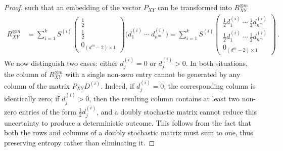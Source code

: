 \documentclass[aps,pra,11pt,onecolumn,nofootinbib,tightenlines]{revtex4-2}
\theoremstyle{definition}
\begin{document}
\begin{proof}
such that an embedding of the vector \( P_{XY} \) can be transformed into \( R_{XY}^{\otimes m} \)
\begin{align}\label{eq:apu3}
R_{XY}^{\otimes m}&=\sum_{i=1}^k S^{(i)}
\begin{pmatrix}
    \frac{1}{2}\\
    \frac{1}{2} \\
    0_{(d^m-2)\times 1}
\end{pmatrix}
\big(d^{(i)}_{1}\ \cdots\ d^{(i)}_{n^m}\big)=\sum_{i=1}^k S^{(i)}
\begin{pmatrix}
    \frac{1}{2}d^{(i)}_{1}\ \cdots\ \frac{1}{2}d^{(i)}_{n^m} \\
   \frac{1}{2} d^{(i)}_{1}\ \cdots\ \frac{1}{2}d^{(i)}_{n^m} \\
   0_{(d^m-2) \times 1}
\end{pmatrix} \,.
\end{align}
We now distinguish two cases: either \( d_j^{(i)} = 0 \) or \( d_j^{(i)} > 0 \). In both situations, the column of \( R_{XY}^{\otimes m} \) with a single non-zero entry cannot be generated by any column of the matrix \( P_{XY} D^{(i)} \). Indeed, if \( d_j^{(i)} = 0 \), the corresponding column is identically zero; if \( d_j^{(i)} > 0 \), then the resulting column contains at least two non-zero entries of the form \( \frac{1}{2} d_j^{(i)} \), and a doubly stochastic matrix cannot reduce this uncertainty to produce a deterministic outcome. This follows from the fact that both the rows and columns of a doubly stochastic matrix must sum to one, thus preserving entropy rather than eliminating it.


\end{proof}
\end{document}
